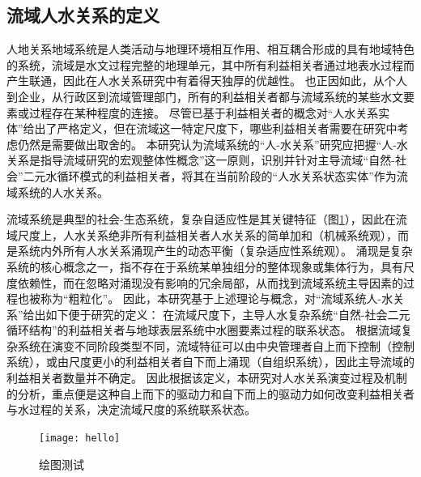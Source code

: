 

\subsection{流域人水关系的定义}

人地关系地域系统是人类活动与地理环境相互作用、相互耦合形成的具有地域特色的系统\cite{tan2021}，流域是水文过程完整的地理单元，其中所有利益相关者通过地表水过程而产生联通，因此在人水关系研究中有着得天独厚的优越性。
也正因如此，从个人到企业，从行政区到流域管理部门，所有的利益相关者都与流域系统的某些水文要素或过程存在某种程度的连接。
尽管已基于利益相关者的概念对“人水关系实体”给出了严格定义，但在流域这一特定尺度下，哪些利益相关者需要在研究中考虑仍然是需要做出取舍的。
本研究认为流域系统的“人-水关系”研究应把握“人-水关系是指导流域研究的宏观整体性概念”这一原则，识别并针对主导流域“自然-社会”二元水循环模式的利益相关者，将其在当前阶段的“人水关系状态实体”作为流域系统的人水关系。

流域系统是典型的社会-生态系统，复杂自适应性是其关键特征（图\ref{ch2:fig:complexity}），因此在流域尺度上，人水关系绝非所有利益相关者人水关系的简单加和（机械系统观），而是系统内外所有人水关系涌现产生的动态平衡（复杂适应性系统观）。
涌现是复杂系统的核心概念之一，指不存在于系统某单独组分的整体现象或集体行为，具有尺度依赖性，而在忽略对涌现没有影响的冗余局部，从而找到流域系统主导因素的过程也被称为“粗粒化”。
因此，本研究基于上述理论与概念，对“流域系统人-水关系”给出如下便于研究的定义：
在流域尺度下，主导人水复杂系统“自然-社会二元循环结构”的利益相关者与地球表层系统中水圈要素过程的联系状态。
根据流域复杂系统在演变不同阶段类型不同，流域特征可以由中央管理者自上而下控制（控制系统），或由尺度更小的利益相关者自下而上涌现（自组织系统），因此主导流域的利益相关者数量并不确定。
因此根据该定义，本研究对人水关系演变过程及机制的分析，重点便是这种自上而下的驱动力和自下而上的驱动力如何改变利益相关者与水过程的关系，决定流域尺度的系统联系状态。

\begin{figure}[htb] %
    \texttt{[image: hello]}
    \caption[流域系统作为社会-生态系统的概念图式]{绘图测试}\label{ch2:fig:complexity}
\end{figure}
